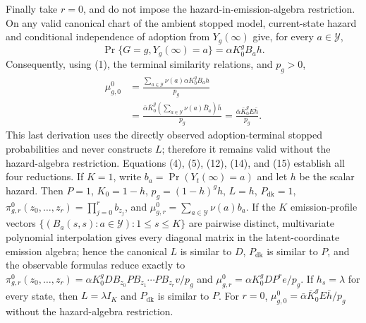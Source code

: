Finally take \(r=0\), and do not impose the hazard-in-emission-algebra restriction.  On any valid canonical chart of the ambient stopped model, current-state hazard and conditional independence of adoption from \(Y_g(\infty)\) give, for every \(a\in\mathcal Y\),
\[
 \Pr\{G=g,Y_g(\infty)=a\}=\alpha K_0^gB_ah.
\]
Consequently, using (1), the terminal similarity relations, and \(p_g>0\),
\[
 \begin{aligned}
 \mu^0_{g,0}
 &=\frac{\sum_{a\in\mathcal Y}\nu(a)\alpha K_0^gB_ah}{p_g}\\
 &=\frac{\bar\alpha\bar K_0^g
 \left(\sum_{a\in\mathcal Y}\nu(a)\bar B_a\right)\bar h}{p_g}
 =\frac{\bar\alpha\bar K_0^gE\bar h}{p_g}.
 \end{aligned}                                                                  \tag{15}
\]
This last derivation uses the directly observed adoption-terminal stopped probabilities and never constructs \(L\); therefore it remains valid without the hazard-algebra restriction.  Equations (4), (5), (12), (14), and (15) establish all four reductions.
If \(K=1\), write \(b_a=\Pr(Y_t(\infty)=a)\) and let \(h\) be the scalar hazard. Then \(P=1\), \(K_0=1-h\), \(p_g=(1-h)^gh\), \(L=h\), \(P_{\mathrm{dk}}=1\), \(\pi^0_{g,r}(z_0,\ldots,z_r)=\prod_{j=0}^r b_{z_j}\), and \(\mu^0_{g,r}=\sum_{a\in\mathcal Y}\nu(a)b_a\). If the \(K\) emission-profile vectors \(\{(B_a(s,s):a\in\mathcal Y):1\le s\le K\}\) are pairwise distinct, multivariate polynomial interpolation gives every diagonal matrix in the latent-coordinate emission algebra; hence the canonical \(L\) is similar to \(D\), \(P_{\mathrm{dk}}\) is similar to \(P\), and the observable formulas reduce exactly to \(\pi^0_{g,r}(z_0,\ldots,z_r)=\alpha K_0^gDB_{z_0}PB_{z_1}\cdots PB_{z_r}v/p_g\) and \(\mu^0_{g,r}=\alpha K_0^gDP^re/p_g\). If \(h_s=\lambda\) for every state, then \(L=\lambda I_K\) and \(P_{\mathrm{dk}}\) is similar to \(P\). For \(r=0\), \(\mu^0_{g,0}=\bar\alpha\bar K_0^gE\bar h/p_g\) without the hazard-algebra restriction.
